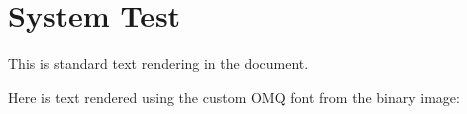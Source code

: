 \documentclass{article}
\begin{document}
\section*{System Test}

This is standard text rendering in the document.

Here is text rendered using the custom OMQ font from the binary image: 
\end{document}
